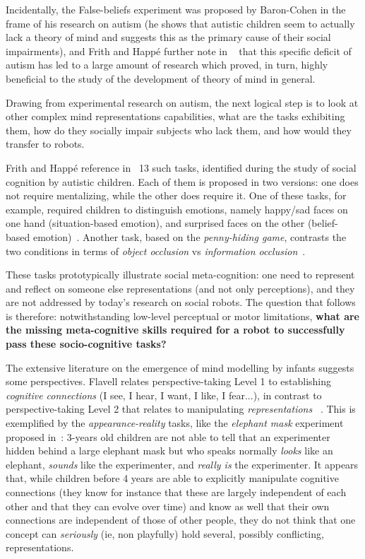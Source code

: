 \documentclass{sig-alternate}
\begin{document}
Incidentally, the False-beliefs experiment was proposed by Baron-Cohen in the
frame of his research on autism (he shows that autistic children seem to
actually lack a theory of mind and suggests this as the primary cause of their
social impairments), and Frith and Happé further note in ~\cite{frith1994autism}
that this specific deficit of autism has led to a large amount of research which
proved, in turn, highly beneficial to the study of the development of theory of
mind in general.

Drawing from experimental research on autism, the next logical step is to look
at other complex mind representations capabilities, what are the tasks
exhibiting them, how do they socially impair subjects who lack them, and how
would they transfer to robots.

Frith and Happé reference in~\cite{frith1994autism} 13 such tasks, identified
during the study of social cognition by autistic children. Each of them is
proposed in two versions: one does not require mentalizing, while the other does
require it. One of these tasks, for example, required children to distinguish
emotions, namely happy/sad faces on one hand (situation-based emotion), and
surprised faces on the other (belief-based emotion)~\cite{baron1993children}.
Another task, based on the \emph{penny-hiding game}, contrasts the two
conditions in terms of \emph{object occlusion} vs \emph{information
occlusion}~\cite{baron1992out}.

These tasks prototypically illustrate social meta-cognition: one need to
represent and reflect on someone else representations (and not only
perceptions), and they are not addressed by today's research on social robots.
The question that follows is therefore: notwithstanding low-level perceptual or
motor limitations, \textbf{what are the missing meta-cognitive skills required
for a robot to successfully pass these socio-cognitive tasks?}

The extensive literature on the emergence of mind modelling by infants suggests
some perspectives. Flavell relates perspective-taking Level 1 to establishing
\emph{cognitive connections} (I see, I hear, I want, I like, I fear...), in
contrast to perspective-taking Level 2 that relates to manipulating
\emph{representations }~\cite{flavell1990developmental}.  This is exemplified by
the \emph{appearance-reality} tasks, like the \emph{elephant mask} experiment
proposed in~\cite{flavell1990developmental}: 3-years old children are not able
to tell that an experimenter hidden behind a large elephant mask but who speaks
normally \emph{looks} like an elephant, \emph{sounds} like the experimenter, and
\emph{really is} the experimenter.  It appears that, while children before 4
years are able to explicitly manipulate cognitive connections (they know for
instance that these are largely independent of each other and that they can
evolve over time) and know as well that their own connections are independent of
those of other people, they do not think that one concept can \emph{seriously}
(ie, non playfully) hold several, possibly conflicting, representations.
\end{document}
